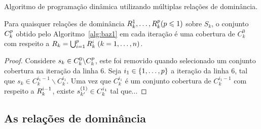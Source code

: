 \begin{algorithm}
  \caption{Algoritmo de programação dinâmica utilizando múltiplas relações de dominância.}
  \label{alg:baz1}
  
\end{algorithm}

\begin{myprop}
  Para quaisquer relações de dominância $R_k^1, \ldots, R_k^p (p \leqslant 1)$
  sobre $S_k$, o conjunto $C_k^p$ obtido pelo Algoritmo~\ref{alg:baz1}
  em cada iteração é uma cobertura de $C_k^0$ com respeito a
  $R_k = \bigcup_{i=1}^p R_k^i \; (k = 1, \ldots, n)$.
\end{myprop}

\begin{proof}
Considere $s_k \in C_k^0\backslash C_k^p$, este foi removido quando
selecionado um conjunto cobertura na iteração da linha 6.
Seja $i_1 \in \{1, \ldots, p \}$ a iteração da linha 6, tal que
$s_k \in C_k^{i_1 - 1}\backslash C_k^{i_1}$.
Uma vez que $C_k^{i_1}$ é um conjunto cobertura de $C_k^{i_1-1}$ com respeito
a $R_k^{i-1}$, existe $s_{k'}^{(1)} \in C_k^{i_1}$ tal que...
\end{proof}

\subsection{As relações de dominância}
\label{sec:domrel}
